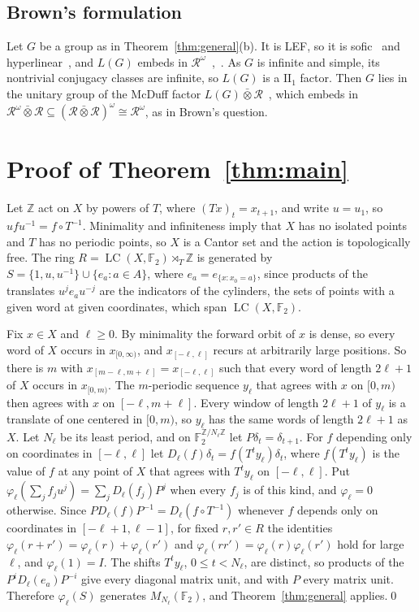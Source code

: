 \documentclass[11pt]{amsart}
\newcommand{\F}{\mathbb F}
\newcommand{\Z}{\mathbb Z}
\newcommand{\LC}{\operatorname{LC}}
\begin{document}
\subsection*{Brown's formulation}
Let $G$ be a group as in Theorem~\ref{thm:general}\textup{(b)}. It is
LEF, so it is sofic~\cite[Example~4.5]{Pestov} and
hyperlinear~\cite[Theorem~2]{ElekSzabo}, and $L(G)$ embeds in
$\mathcal R^\omega$~\cite{Kirchberg,Radulescu},~\cite[Proposition~7.1]{Ozawa}.
As $G$ is infinite and simple, its nontrivial conjugacy classes are
infinite, so $L(G)$ is a $\mathrm{II}_1$ factor. Then $G$ lies in the
unitary group of the McDuff factor $L(G)\mathbin{\bar\otimes}\mathcal
R$~\cite{McDuff}, which embeds in $\mathcal
R^\omega\mathbin{\bar\otimes}\mathcal R\subseteq(\mathcal
R\mathbin{\bar\otimes}\mathcal R)^\omega\cong\mathcal R^\omega$, as in
Brown's question.

\section{Proof of Theorem~\ref{thm:main}}\label{sec:main}

Let $\Z$ act on $X$ by powers of $T$, where $(Tx)_t=x_{t+1}$, and write
$u=u_1$, so $ufu^{-1}=f\circ T^{-1}$. Minimality and infiniteness imply
that $X$ has no isolated points and $T$ has no periodic points, so $X$ is
a Cantor set and the action is topologically free. The ring
$R=\LC(X,\F_2)\rtimes_T\Z$ is generated by
$S=\{1,u,u^{-1}\}\cup\{e_a:a\in A\}$, where $e_a=e_{\{x:x_0=a\}}$, since
products of the translates $u^je_au^{-j}$ are the indicators of the
cylinders, the sets of points with a given word at given coordinates,
which span $\LC(X,\F_2)$.

Fix $x\in X$ and $\ell\ge0$. By minimality the forward orbit of $x$ is
dense, so every word of $X$ occurs in $x_{[0,\infty)}$, and
$x_{[-\ell,\ell]}$ recurs at arbitrarily large positions. So there is $m$
with $x_{[m-\ell,m+\ell]}=x_{[-\ell,\ell]}$ such that every word of length
$2\ell+1$ of $X$ occurs in $x_{[0,m)}$. The $m$-periodic sequence $y_\ell$
that agrees with $x$ on $[0,m)$ then agrees with $x$ on $[-\ell,m+\ell]$.
Every window of length $2\ell+1$ of $y_\ell$ is a translate of one
centered in $[0,m)$, so $y_\ell$ has the same words of length $2\ell+1$ as
$X$. Let $N_\ell$ be its least period, and on $\F_2^{\Z/N_\ell\Z}$ let
$P\delta_t=\delta_{t+1}$. For $f$ depending only on coordinates in
$[-\ell,\ell]$ let $D_\ell(f)\delta_t=f(T^ty_\ell)\delta_t$, where
$f(T^ty_\ell)$ is the value of $f$ at any point of $X$ that agrees with
$T^ty_\ell$ on $[-\ell,\ell]$. Put
$\varphi_\ell(\sum_jf_ju^j)=\sum_jD_\ell(f_j)P^j$ when every $f_j$ is of
this kind, and $\varphi_\ell=0$ otherwise. Since
$PD_\ell(f)P^{-1}=D_\ell(f\circ T^{-1})$ whenever $f$ depends only on
coordinates in $[-\ell+1,\ell-1]$, for fixed $r,r'\in R$ the identities
$\varphi_\ell(r+r')=\varphi_\ell(r)+\varphi_\ell(r')$ and
$\varphi_\ell(rr')=\varphi_\ell(r)\varphi_\ell(r')$ hold for large $\ell$,
and $\varphi_\ell(1)=I$. The shifts $T^ty_\ell$, $0\le t<N_\ell$, are
distinct, so products of the $P^iD_\ell(e_a)P^{-i}$ give every diagonal
matrix unit, and with $P$ every matrix unit. Therefore $\varphi_\ell(S)$
generates $M_{N_\ell}(\F_2)$, and Theorem~\ref{thm:general} applies.\qed
\end{document}
